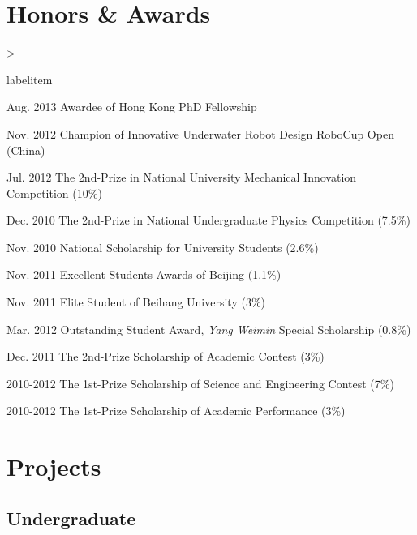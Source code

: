 \documentclass[10pt,letterpaper]{article}
\makeatletter
\newenvironment{dateitemize}{%
  \ifnum \@itemdepth >\thr@@\@toodeep\else
    \advance\@itemdepth\@ne
    \edef\@itemitem{labelitem\romannumeral\the\@itemdepth}%
    \expandafter
    \list
      \csname\@itemitem\endcsname
      {%
      \advance\rightmargin3cm
      \def\makelabel##1{\hss\llap{\textbullet}\rlap{\hbox to \dimexpr\linewidth+\rightmargin+\itemsep\relax{\hss##1}}}}%
  \fi}
\makeatother
\begin{document}
\section*{Honors \& Awards}

\begin{dateitemize}
  \item[Aug. 2013] Awardee of Hong Kong PhD Fellowship
  \item[Nov. 2012] Champion of Innovative Underwater Robot Design RoboCup Open (China)
  \item[Jul. 2012] The 2nd-Prize in National University Mechanical Innovation Competition (10\%)
  \item[Dec. 2010] The 2nd-Prize in National Undergraduate Physics Competition (7.5\%)
  \item[Nov. 2010] National Scholarship for University Students (2.6\%)
  \item[Nov. 2011] Excellent Students Awards of Beijing (1.1\%)
  \item[Nov. 2011] Elite Student of Beihang University (3\%)
  \item[Mar. 2012] Outstanding Student Award, \textit{Yang Weimin} Special Scholarship (0.8\%)
  \item[Dec. 2011] The 2nd-Prize Scholarship of Academic Contest (3\%)
  \item[2010-2012] The 1st-Prize Scholarship of Science and Engineering Contest (7\%)
  \item[2010-2012] The 1st-Prize Scholarship of Academic Performance (3\%)
\end{dateitemize}

\section*{Projects}

\subsection*{Undergraduate}
\end{document}

